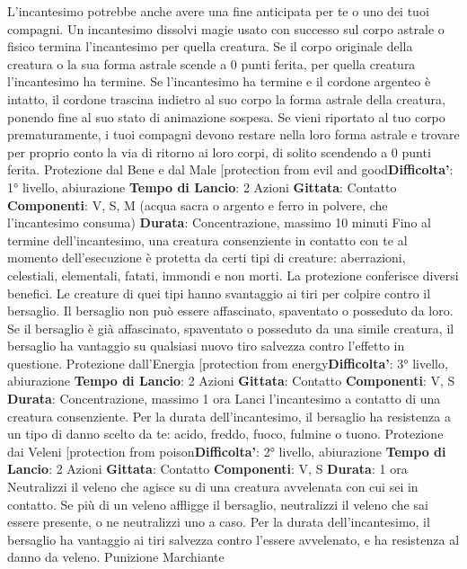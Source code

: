 \begin{multicols}{2}
L’incantesimo potrebbe anche avere una fine anticipata
per te o uno dei tuoi compagni. Un incantesimo dissolvi
magie usato con successo sul corpo astrale o fisico
termina l’incantesimo per quella creatura. Se il corpo
originale della creatura o la sua forma astrale scende a
0 punti ferita, per quella creatura l’incantesimo ha
termine. Se l’incantesimo ha termine e il cordone
argenteo è intatto, il cordone trascina indietro al suo
corpo la forma astrale della creatura, ponendo fine al
suo stato di animazione sospesa.
Se vieni riportato al tuo corpo prematuramente, i tuoi
compagni devono restare nella loro forma astrale e
trovare per proprio conto la via di ritorno ai loro corpi, di
solito scendendo a 0 punti ferita.
Protezione dal Bene e dal Male
[protection from evil and good\textbf{Difficolta'}:
1° livello, abiurazione
\textbf{Tempo di Lancio}: 2 Azioni
\textbf{Gittata}: Contatto
\textbf{Componenti}: V, S, M (acqua sacra o argento e ferro in
polvere, che l’incantesimo consuma)
\textbf{Durata}: Concentrazione, massimo 10 minuti
Fino al termine dell’incantesimo, una creatura
consenziente in contatto con te al momento
dell’esecuzione è protetta da certi tipi di creature:
aberrazioni, celestiali, elementali, fatati, immondi e non
morti.
La protezione conferisce diversi benefici. Le creature di
quei tipi hanno svantaggio ai tiri per colpire contro il
bersaglio. Il bersaglio non può essere affascinato,
spaventato o posseduto da loro. Se il bersaglio è già
affascinato, spaventato o posseduto da una simile
creatura, il bersaglio ha vantaggio su qualsiasi nuovo
tiro salvezza contro l’effetto in questione.
Protezione dall’Energia
[protection from energy\textbf{Difficolta'}:
3° livello, abiurazione
\textbf{Tempo di Lancio}: 2 Azioni
\textbf{Gittata}: Contatto
\textbf{Componenti}: V, S
\textbf{Durata}: Concentrazione, massimo 1 ora
Lanci l’incantesimo a contatto di una creatura
consenziente. Per la durata dell’incantesimo, il
bersaglio ha resistenza a un tipo di danno scelto da te:
acido, freddo, fuoco, fulmine o tuono.
Protezione dai Veleni
[protection from poison\textbf{Difficolta'}:
2° livello, abiurazione
\textbf{Tempo di Lancio}: 2 Azioni
\textbf{Gittata}: Contatto
\textbf{Componenti}: V, S
\textbf{Durata}: 1 ora
Neutralizzi il veleno che agisce su di una creatura
avvelenata con cui sei in contatto. Se più di un veleno
affligge il bersaglio, neutralizzi il veleno che sai essere
presente, o ne neutralizzi uno a caso.
Per la durata dell’incantesimo, il bersaglio ha vantaggio
ai tiri salvezza contro l’essere avvelenato, e ha
resistenza al danno da veleno.
Punizione Marchiante

\end{multicols}
